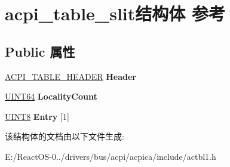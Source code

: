 \hypertarget{structacpi__table__slit}{}\section{acpi\+\_\+table\+\_\+slit结构体 参考}
\label{structacpi__table__slit}
\subsection*{Public 属性}
\begin{DoxyCompactItemize}
\item 
\mbox{\label{structacpi__table__slit_a236d4e11650c8e34c9345a807911cfee}} 
\hyperlink{structacpi__table__header}{A\+C\+P\+I\+\_\+\+T\+A\+B\+L\+E\+\_\+\+H\+E\+A\+D\+ER} {\bfseries Header}
\item 
\mbox{\label{structacpi__table__slit_a599e8ce809655862428781a49aa520b8}} 
\hyperlink{_processor_bind_8h_a57be03562867144161c1bfee95ca8f7c}{U\+I\+N\+T64} {\bfseries Locality\+Count}
\item 
\mbox{\label{structacpi__table__slit_ae603172a53b6354712b5c7c94fc94f6d}} 
\hyperlink{_processor_bind_8h_ab27e9918b538ce9d8ca692479b375b6a}{U\+I\+N\+T8} {\bfseries Entry} \mbox{[}1\mbox{]}
\end{DoxyCompactItemize}


该结构体的文档由以下文件生成\+:\begin{DoxyCompactItemize}
\item 
E\+:/\+React\+O\+S-\/0../drivers/bus/acpi/acpica/include/actbl1.\+h\end{DoxyCompactItemize}
